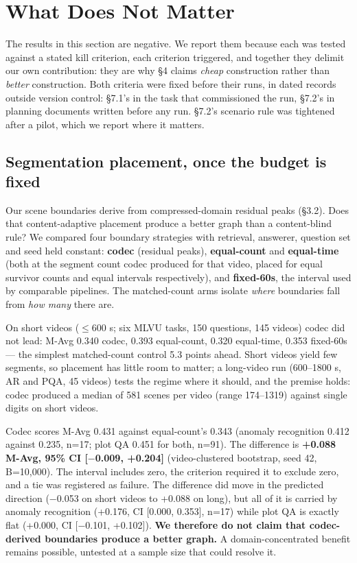 \documentclass[sigconf,review,anonymous]{acmart}
\begin{document}
\section{What Does Not Matter}

The results in this section are negative. We report them because each was tested against a
stated kill criterion, each criterion triggered, and together they delimit our own
contribution: they are why §4 claims \emph{cheap} construction rather than \emph{better} construction.
Both criteria were fixed before their runs, in dated records outside version control: §7.1's
in the task that commissioned the run, §7.2's in planning documents written before any run.
§7.2's scenario rule was tightened after a pilot, which we report where it matters.

\subsection{Segmentation placement, once the budget is fixed}

Our scene boundaries derive from compressed-domain residual peaks (§3.2). Does that
content-adaptive placement produce a better graph than a content-blind rule? We compared four
boundary strategies with retrieval, answerer, question set and seed held constant: \textbf{codec}
(residual peaks), \textbf{equal-count} and \textbf{equal-time} (both at the segment count codec produced
for that video, placed for equal survivor counts and equal intervals respectively), and
\textbf{fixed-60s}, the interval used by comparable pipelines. The matched-count arms isolate
\emph{where} boundaries fall from \emph{how many} there are.

On short videos (\ensuremath{\leq}600 s; six MLVU tasks, 150 questions, 145 videos) codec did not lead: M-Avg
0.340 codec, 0.393 equal-count, 0.320 equal-time, 0.353 fixed-60s --- the simplest matched-count
control 5.3 points ahead. Short videos yield few segments, so placement has little room to
matter; a long-video run (600--1800 s, AR and PQA, 45 videos) tests the regime where it should,
and the premise holds: codec produced a median of 581 scenes per video (range 174--1319)
against single digits on short videos.

Codec scores M-Avg 0.431 against equal-count's 0.343 (anomaly recognition 0.412 against 0.235,
n=17; plot QA 0.451 for both, n=91). The difference is \textbf{+0.088 M-Avg, 95\% CI {[}\ensuremath{-}0.009, +0.204{]}}
(video-clustered bootstrap, seed 42, B=10,000). The interval includes zero, the criterion
required it to exclude zero, and a tie was registered as failure. The difference did move in
the predicted direction (\ensuremath{-}0.053 on short videos to +0.088 on long), but all of it is carried
by anomaly recognition (+0.176, CI {[}0.000, 0.353{]}, n=17) while plot QA is exactly flat
(+0.000, CI {[}\ensuremath{-}0.101, +0.102{]}). \textbf{We therefore do not claim that codec-derived boundaries
produce a better graph.} A domain-concentrated benefit remains possible, untested at a sample
size that could resolve it.
\end{document}
